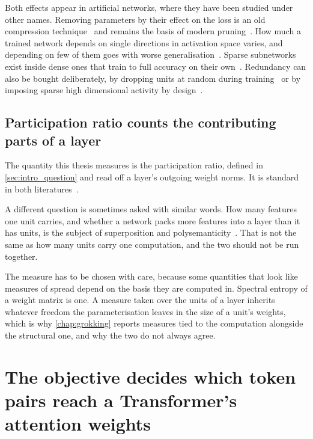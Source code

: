 Both effects appear in artificial networks, where they have been studied under
other names. Removing parameters by their effect on the loss is an old
compression technique~\cite{lecun_optimal_1989} and remains the basis of
modern pruning~\cite{han_learning_2015}. How much a trained network depends on
single directions in activation space varies, and depending on few of them
goes with worse
generalisation~\cite{morcos_importance_2018, zhou_importance_2018}. Sparse
subnetworks exist inside dense ones that train to full accuracy on their
own~\cite{frankle_lottery_2019}. Redundancy can also be bought deliberately, by
dropping units at random during training~\cite{srivastava_dropout_2014} or by
imposing sparse high dimensional activity by
design~\cite{ahmad_can_2019}.

\subsection{Participation ratio counts the contributing parts of a layer}
\label{sec:bg_measures}

The quantity this thesis measures is the participation ratio, defined in
\cref{sec:intro_question} and read off a layer's outgoing weight norms. It is
standard in both
literatures~\cite{litwinkumar_optimal_2017, gao_simplicity_2015}.

A different question is sometimes asked with similar words. How many features
one unit carries, and whether a network packs more features into a layer than
it has units, is the subject of superposition and
polysemanticity~\cite{elhage_toy_2022, bricken_monosemanticity_2023}. That is
not the same as how many units carry one computation, and the two should not
be run together.

The measure has to be chosen with care, because some quantities that look like
measures of spread depend on the basis they are computed in. Spectral entropy
of a weight matrix is one. A measure taken over the units of a layer inherits
whatever freedom the parameterisation leaves in the size of a unit's weights,
which is why \cref{chap:grokking} reports measures tied to the computation
alongside the structural one, and why the two do not always agree.


\section{The objective decides which token pairs reach a Transformer's attention weights}
\label{sec:bg_attention}

